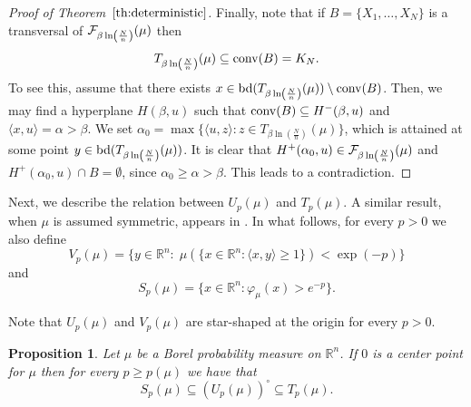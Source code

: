 \documentclass[11pt,leqno]{article}
\newtheorem{proposition}[theorem]{Proposition}
\theoremstyle{definition}
\theoremstyle{remark}
\numberwithin{equation}{section}
\newcommand{\gr}{\geqslant}
\newcommand{\1}{\textbf{1}}
\begin{document}
\begin{proof}[Proof of Theorem~$\ref{th:deterministic}$]
Finally, note  that if $B=\{X_1,\ldots ,X_N\}$ is a transversal of ${\cal F}_{\beta\ln\left(\frac{N}{n}\right)}(\mu)$ then
$$T_{\beta\ln\left(\frac{N}{n}\right)}(\mu)\subseteq {\rm conv}(B)=K_N.$$
To see this, assume that there exists $x\in {\rm bd}(T_{\beta\ln\left(\frac{N}{n}\right)}(\mu))\setminus {\rm conv}(B)$.
Then, we may find a hyperplane $H(\beta ,u)$ such that ${\rm conv}(B)\subseteq H^-(\beta,u)$ and $\langle x,u\rangle =\alpha >\beta$. We set $\alpha_0= \max \{ \langle u, z \rangle : z \in T_{\beta\ln\left(\frac{N}{n}\right)}(\mu) \}$, which is attained at some point
$y \in {\rm bd}(T_{\beta\ln\left(\frac{N}{n}\right)}(\mu))$. It is clear that $H^+(\alpha_0,u) \in {\cal F}_{\beta\ln\left(\frac{N}{n}\right)}(\mu)$ and $H^+(\alpha_0,u) \cap B =\emptyset$, since $\alpha_0\gr \alpha >\beta$. This leads to a contradiction.
\end{proof}




Next, we describe the relation between $U_p(\mu)$ and $T_p(\mu)$.
A similar result, when $\mu$ is assumed symmetric, appears in \cite{HLO-2023}. In what follows, for every $p>0$ we also define
$$V_p(\mu)=\{y\in \mathbb{R}^n:\;\mu(\{x\in\mathbb{R}^n:\langle x,y\rangle\gr 1\}) < \exp(-p)\}$$
and
$$S_p(\mu)=\{x\in\mathbb{R}^n:\varphi_{\mu}(x)>e^{-p}\}.$$

Note that $U_p(\mu)$ and $V_p(\mu)$ are star-shaped at the  origin for every $p>0$.


\begin{proposition}\label{prop:U-T}Let $\mu$ be a Borel probability measure on $\mathbb{R}^n$. If $0$ is a center point for $\mu$ then for every $p\gr p(\mu)$ we have that
\begin{equation}\label{eq:U-T}S_p(\mu)\subseteq (U_p(\mu))^{\circ}\subseteq T_p(\mu).\end{equation}
\end{proposition}
\end{document}
